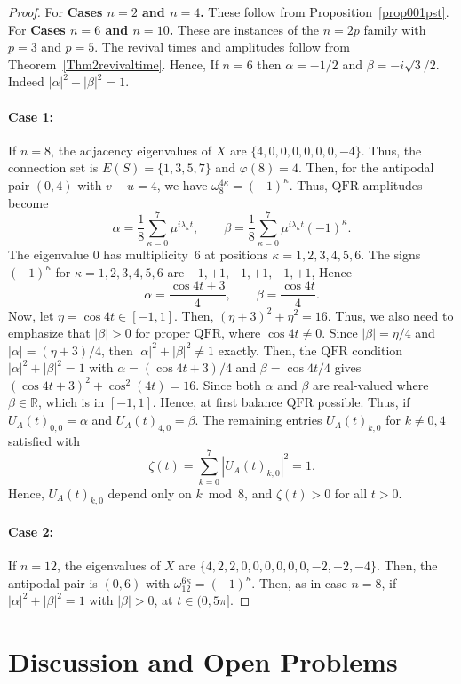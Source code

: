 \documentclass[12pt]{amsart}
\newcommand{\case}[1]{\paragraph*{Case #1:}}
\newcommand{\QFR}{\mathrm{QFR}}
\begin{document}
\begin{proof}
For \textbf{Cases $n=2$ and $n=4$.} These follow from Proposition~\ref{prop001pst}. For \textbf{Cases $n=6$ and $n=10$.} These are instances of the $n=2p$ family with
  $p=3$ and $p=5$. The revival times and amplitudes follow from Theorem~\ref{Thm2revivaltime}. 
  Hence, If  $n=6$ then  $\alpha= -1/2$ and
  $\beta=-i\sqrt{3}/2$.  Indeed
  $|\alpha|^2 + |\beta|^2=1$. 

\case{1} {If $n=8$,} the adjacency eigenvalues of $X$ are
  $\{4, 0, 0, 0, 0, 0, 0, -4\}$. Thus, the
  connection set is $E(S)=\{1, 3, 5, 7\}$ and $\varphi(8)=4$. Then, for the
  antipodal pair $(0, 4)$ with $v-u=4$, we have $\omega_8^{4\kappa}=(-1)^\kappa$. Thus, $\QFR$ amplitudes become
\begin{equation*}
\alpha = \frac{1}{8}\sum_{\kappa=0}^{7} \mu^{i\lambda_{\kappa} t}, \qquad
    \beta  = \frac{1}{8}\sum_{\kappa=0}^{7} \mu^{i\lambda_{\kappa} t}(-1)^\kappa.
\end{equation*}
The eigenvalue $0$ has multiplicity~6 at positions $\kappa= 1,2,3,4,5,6$. The signs $(-1)^\kappa$
  for $\kappa= 1, 2, 3, 4, 5, 6$ are $-1, +1, -1, +1, -1, +1$, Hence
  \[
\alpha=\frac{\cos 4t +3}{4}, \qquad    \beta= \frac{\cos 4t}{4}.
  \]
  Now, let $\eta=\cos 4t \in [-1,1]$. Then, $(\eta+3)^2 + \eta^2 = 16$. Thus, we
  also need to emphasize that $|\beta| > 0$ for proper $\QFR$, where $\cos 4t \neq 0$. Since
  $|\beta| = \eta/4$ and $|\alpha|=(\eta+3)/4$, then 
  $|\alpha|^2 + |\beta|^2 \neq 1$ exactly.
 Then, the $\QFR$ condition $|\alpha|^2+|\beta|^2=1$ with $\alpha = (\cos4t+3)/4$
  and $\beta = \cos4t/4$ gives $(\cos4t+3)^2 + \cos^2(4t) = 16$. Since both $\alpha$ and
  $\beta$ are real-valued where $\beta \in \mathbb{R}$, which is in $[-1,1]$. Hence, at first balance $\QFR$ possible.
Thus, if  $U_A(t)_{0,0}=\alpha$ and $U_A(t)_{4,0}=\beta$. The remaining entries
  $U_A(t)_{k,0}$ for $k \neq 0, 4$satisfied with 
  $$\zeta(t)=\sum_{k=0}^{7}|U_A(t)_{k,0}|^2 = 1.$$
Hence, $U_A(t)_{k,0}$ depend only on $k \bmod 8$, and 
 $\zeta(t)> 0$ for all $t > 0$. 

 \case{2} {If $n=12$,} the eigenvalues of $X$ are
  $\{4, 2, 2, 0, 0, 0, 0, 0, 0, -2, -2, -4\}$. Then, the
  antipodal pair is $(0, 6)$ with $\omega_{12}^{6\kappa}=(-1)^\kappa$. Then, as in case $n=8$, if $|\alpha|^2 + |\beta|^2 = 1$ with $|\beta| > 0$, at $t \in (0, 5\pi]$.
\end{proof}

\section{Discussion and Open Problems}
\end{document}

